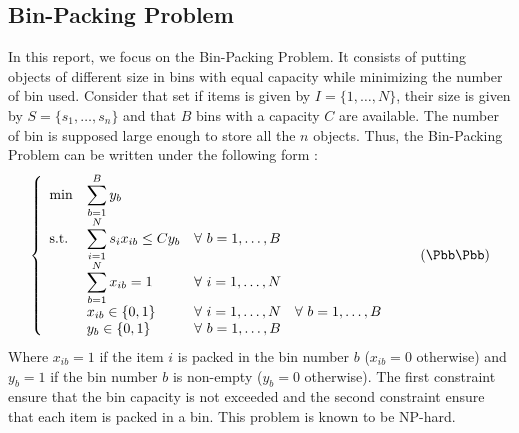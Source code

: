 \subsection{Bin-Packing Problem}

In this report, we focus on the Bin-Packing Problem. It consists of putting objects of different size in bins with equal capacity while minimizing the number of bin used. Consider that set if items is given by $I = \{1,\dots,N\}$, their size is given by $S = \{s_1,\dots,s_n\}$ and that $B$ bins with a capacity $C$ are available. The number of bin is supposed large enough to store all the $n$ objects. Thus, the Bin-Packing Problem can be written under the following form :
\begin{equation}
	\label{BPP-classic}
	\left \{
	\begin{array}{*5{>{\displaystyle}l}}
	\min & \sum_{b=1}^B{y_b} \\
	\st & \sum_{i=1}^N s_i x_{ib} \leq C y_b & \forall \ b = 1,\dots,B \\
	& \sum_{b=1}^N x_{ib} = 1 & \forall \ i = 1,\dots,N \\
	& x_{ib} \in \{0,1\} & \forall \ i=1,\dots,N & \forall \ b = 1,\dots,B \\
	& y_{b} \in \{0,1\} &  \forall \ b = 1,\dots,B
	\end{array}
	\right.
	\tag{$\Bbb\Pbb\Pbb$}
\end{equation}
Where $x_{ib}=1$ if the item $i$ is packed in the bin number $b$ ($x_{ib}=0$ otherwise) and $y_b=1$ if the bin number $b$ is non-empty ($y_b=0$ otherwise). The first constraint ensure that the bin capacity is not exceeded and the second constraint ensure that each item is packed in a bin. This problem is known to be NP-hard.
